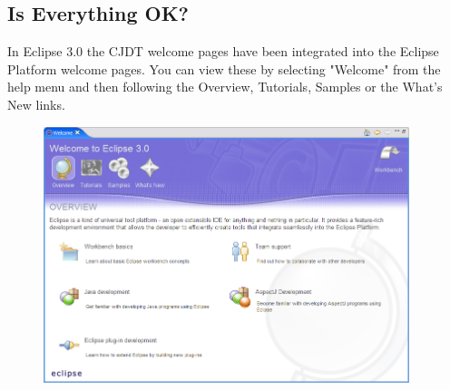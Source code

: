 \subsection{Is Everything OK?} 
In Eclipse 3.0 the CJDT welcome pages have been integrated into the Eclipse Platform welcome pages. You can view
these by selecting "Welcome" from the help menu and then following the Overview, Tutorials,
Samples or the What's New links.\\
\begin{figure}[htbp]
	\centering
		\includegraphics[width=0.95\textwidth]{./images/welcome_3_0.png}
	\label{fig:welcome_3_0}
\end{figure}
